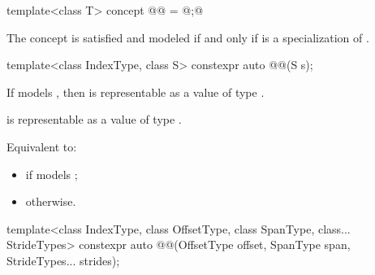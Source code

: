 \begin{itemdecl}
template<class T>
  concept @@ = @\seebelow;@
\end{itemdecl}

\begin{itemdescr}
\pnum
The concept 
is satisfied and modeled if and only
if  is a specialization of .
\end{itemdescr}

%
\begin{itemdecl}
template<class IndexType, class S>
  constexpr auto @@(S s);
\end{itemdecl}

\begin{itemdescr}
\pnum
\mandates
If  models ,
then 
is representable as a value of type .

\pnum
\expects
{}
is representable as a value of type .

\pnum
\effects
Equivalent to:
\begin{itemize}
\item
{}
if  models ;
\item
{} otherwise.
\end{itemize}
\end{itemdescr}

\begin{itemdecl}
template<class IndexType, class OffsetType, class SpanType, class... StrideTypes>
  constexpr auto @@(OffsetType offset, SpanType span, StrideTypes... strides);
\end{itemdecl}

